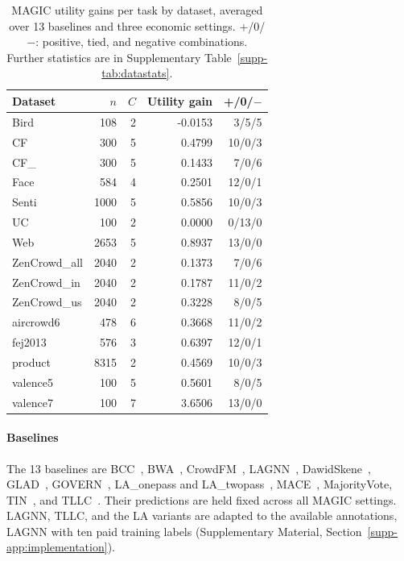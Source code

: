 \documentclass[journal]{IEEEtran}
\newcommand{\smalltable}{\footnotesize\setlength{\tabcolsep}{3.5pt}}
\begin{document}
\begin{table}[t]
\caption{MAGIC utility gains per task by dataset, averaged over 13 baselines and three economic settings. +/0/$-$: positive, tied, and negative combinations. Further statistics are in Supplementary Table~\ref{supp-tab:datastats}.}
\label{tab:datasets}\centering\smalltable
\begin{tabular}{lrrrr}
\toprule
Dataset & $n$ & $C$ & Utility gain & +/0/$-$ \\
\midrule
Bird & 108 & 2 & -0.0153 & 3/5/5 \\
CF & 300 & 5 & 0.4799 & 10/0/3 \\
CF\_ & 300 & 5 & 0.1433 & 7/0/6 \\
Face & 584 & 4 & 0.2501 & 12/0/1 \\
Senti & 1000 & 5 & 0.5856 & 10/0/3 \\
UC & 100 & 2 & 0.0000 & 0/13/0 \\
Web & 2653 & 5 & 0.8937 & 13/0/0 \\
ZenCrowd\_all & 2040 & 2 & 0.1373 & 7/0/6 \\
ZenCrowd\_in & 2040 & 2 & 0.1787 & 11/0/2 \\
ZenCrowd\_us & 2040 & 2 & 0.3228 & 8/0/5 \\
aircrowd6 & 478 & 6 & 0.3668 & 11/0/2 \\
fej2013 & 576 & 3 & 0.6397 & 12/0/1 \\
product & 8315 & 2 & 0.4569 & 10/0/3 \\
valence5 & 100 & 5 & 0.5601 & 8/0/5 \\
valence7 & 100 & 7 & 3.6506 & 13/0/0 \\
\bottomrule
\end{tabular}
\end{table}

\paragraph{Baselines}
The 13 baselines are BCC~\cite{kim2012bayesian}, BWA~\cite{li2019truth}, CrowdFM~\cite{liu2026crowdfm}, LAGNN~\cite{ying2024little}, DawidSkene~\cite{dawid1979maximum}, GLAD~\cite{whitehill2009whose}, GOVERN~\cite{liu2024govern}, LA\_onepass and LA\_twopass~\cite{yang2024la}, MACE~\cite{hovy2013mace}, MajorityVote, TIN~\cite{han2025multimodal}, and TLLC~\cite{zhang2025tllc}. Their predictions are held fixed across all MAGIC settings. LAGNN, TLLC, and the LA variants are adapted to the available annotations, LAGNN with ten paid training labels (Supplementary Material, Section~\ref{supp-app:implementation}).
\end{document}
